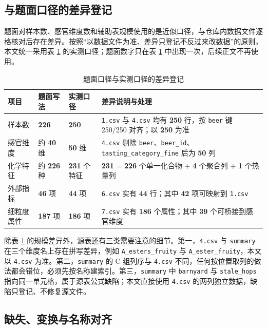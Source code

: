 \subsection{与题面口径的差异登记}

题面对样本数、感官维度数和辅助表规模使用的是近似口径，与仓库内数据文件逐格核对后存在差异。按照“以数据文件为准、差异只登记不反过来改数据”的原则，本文统一采用表 \ref{tab:caliber} 的实测口径；题面数字只在表 \ref{tab:caliber} 中出现一次，后续正文不再使用。

\begin{table}[H]
\centering
{}
\begin{tabularx}{\textwidth}{@{}p{}p{}p{}X@{}}
\toprule
项目 & 题面写法 & 实测口径 & 差异说明与处理 \\
\midrule
样本数 & \textbf{226} & \textbf{250} & \texttt{1.csv} 与 \texttt{4.csv} 均有 \textbf{250} 行，按 \texttt{beer} 键 250/250 对齐；以 \textbf{250} 为准 \\
感官维度 & 约 \textbf{40} 维 & \textbf{50} 维 & \texttt{4.csv} 剔除 \texttt{beer}、\texttt{beer\_id}、\texttt{tasting\_category\_fine} 后为 \textbf{50} 列 \\
化学特征 & 约 \textbf{226} 种 & \textbf{231} 个特征 & \textbf{231} = \textbf{226} 个单一化合物 + \textbf{4} 个聚合列 + \textbf{1} 个热量列 \\
外部指标 & \textbf{46} 项 & \textbf{44} 项 & \texttt{6.csv} 实有 \textbf{44} 行；其中 \textbf{42} 项可映射到 \texttt{1.csv} \\
细粒度属性 & \textbf{187} 项 & \textbf{186} 项 & \texttt{7.csv} 实有 \textbf{186} 个属性；其中 \textbf{39} 个可桥接到感官维度 \\
\bottomrule
\end{tabularx}
\caption{题面口径与实测口径的差异登记}
\label{tab:caliber}
\end{table}

除表 \ref{tab:caliber} 的规模差异外，源表还有三类需要注意的细节。第一，\texttt{4.csv} 与 \texttt{summary} 在三个维度名上存在拼写差异，例如 \texttt{A\_esters\_fruity} 与 \texttt{A\_ester\_fruity}，本文以 \texttt{4.csv} 为准。第二，\texttt{summary} 的 C 组列序与 \texttt{4.csv} 不同，任何按位置取列的做法都会错位，必须先按名称建索引。第三，\texttt{summary} 中 \texttt{barnyard} 与 \texttt{stale\_hops} 指向同一单元格，属于源表公式缺陷；本文直接使用 \texttt{4.csv} 的两列独立数据，缺陷只登记、不修复源文件。

\subsection{缺失、变换与名称对齐}

